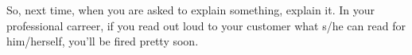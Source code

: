\begin{exercise}[1.5]
\begin{solution}
  So, next time, when you are asked to explain something, explain it.
  In your professional carreer, if you read out loud to your customer what s/he can read for him/herself, you'll be fired pretty soon.
\end{solution}

\end{exercise}
